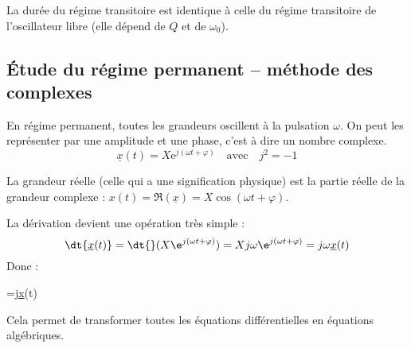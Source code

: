 \documentclass{cours}
\begin{document}
\begin{center}
\end{center}
La durée du régime transitoire est identique à celle du régime transitoire de l'oscillateur libre (elle dépend de $Q$ et de $\omega_0$).

\subsection{\'Etude du régime permanent -- méthode des complexes}
En régime permanent, toutes les grandeurs oscillent à la pulsation $\omega$. On peut les représenter par une amplitude et une phase, c'est à dire un nombre complexe.
\begin{equation}
\underline{x}(t) = X\mathrm{e}^{j(\omega t+\varphi)} \quad \text{avec} \quad j^2=-1
\end{equation}

La grandeur réelle (celle qui a une signification physique) est la partie réelle de la grandeur complexe : $x(t)=\Re(\underline{x})= X\cos(\omega t+\varphi)$.

La dérivation devient une opération très simple : 
\begin{equation}
\dt{\underline{x}(t)} = \dt{}(X\e^{j(\omega t+\varphi)}) = Xj\omega\e^{j(\omega t+\varphi)}=j\omega \underline{x}(t)
\end{equation}
Donc :
\begin{eqencadre}
=j\omega \underline{x}(t)
\end{eqencadre}
Cela permet de transformer toutes les équations différentielles en équations algébriques.
\end{document}
